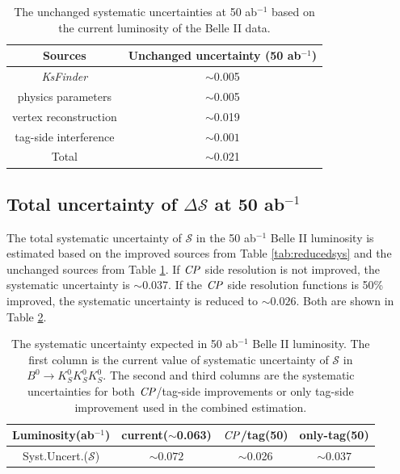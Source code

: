 \begin{table}[htpb]
	\centering
	\caption{The unchanged systematic uncertainties at 50 ab$^{-1}$ based on the current luminosity of the Belle II data.}
	\label{tab:unchangedsys}
	\begin{tabular}{c| c}
		\hline
		Sources & Unchanged uncertainty (50 ab$^{-1}$) \\
		\hline
		\textit{KsFinder} & $\sim$0.005\\
		physics parameters &  $\sim$0.005 \\
		vertex reconstruction &  $\sim$0.019\\
		tag-side interference &  $\sim0.001$\\
		\hline
		Total & $\sim$0.021\\
		\hline
	\end{tabular}
\end{table}

\subsection{Total uncertainty of $\Delta \mathcal{S}$ at 50 ab$^{-1}$}
The total systematic uncertainty of $\mathcal{S}$ in the 50 ab$^{-1}$ Belle II luminosity is estimated based on the improved sources from Table \ref{tab:reducedsys} and the unchanged sources from Table \ref{tab:unchangedsys}. If $\it{CP}$ side resolution is not improved, the systematic uncertainty is $\sim$0.037. If the $\it{CP}$ side resolution functions is 50\% improved, the systematic uncertainty is reduced to  $\sim0.026$. Both are shown in Table \ref{tab:sys_full}.
\begin{table}[htpb]
	\centering
	\caption{The systematic uncertainty expected in 50 ab$^{-1}$ Belle II luminosity. The first column is the current value of systematic uncertainty of $\mathcal{S}$ in $B^0 \to K_S^0  K_S^0  K_S^0$. The second and third columns are the systematic uncertainties for both $\it{CP}$/tag-side improvements or only tag-side improvement used in the combined estimation.}
	\label{tab:sys_full}
	\begin{tabular}{c| c | c |c}
		\hline
		Luminosity(ab$^{-1}$) & current($\sim$0.063) & $\it{CP}$/tag(50)& only-tag(50)\\
		\hline
		Syst.Uncert.($\mathcal{S}$) & $\sim0.072$ & $\sim$0.026 & $\sim0.037$\\
		\hline
	\end{tabular}
\end{table}


